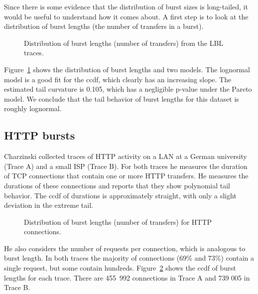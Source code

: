 \documentclass{elsart}
\begin{document}

Since there is some evidence that the distribution of burst
sizes is long-tailed, it
would be useful to understand how it comes about.  A first step is to
look at the distribution of burst lengths (the number of transfers in
a burst).

\begin{figure}[tb]
\centerline{}
\caption{Distribution of burst lengths (number of transfers) from the
LBL traces.}
\label{fig.ftp.length}
\end{figure}

Figure~\ref{fig.ftp.length} shows the distribution of burst lengths
and two models.
The lognormal model
is a good fit for the ccdf, which clearly has an increasing slope.
The estimated tail curvature is 0.105, which has a negligible
p-value under the Pareto model.  We conclude that the tail behavior of
burst lengths for this dataset is roughly lognormal.



\subsection {HTTP bursts}

Charzinski \cite{Charzinski00} collected traces of HTTP activity on a
LAN at a German university (Trace A) and a small ISP (Trace B).  For
both traces he measures the duration of TCP connections that contain
one or more HTTP transfers.  He measures the durations of these
connections and reports that they show polynomial tail behavior.  The
ccdf of durations is approximately straight, with only a slight
deviation in the extreme tail.

\begin{figure}[tb]
\centerline{}
\vspace{0.1in}
\centerline{}
\caption{Distribution of burst lengths (number of transfers) for
HTTP connections.}
\label{fig.http.length}
\end{figure}

He also considers the number of requests per connection, which is
analogous to burst length.  In both traces the majority of connections
(69\% and 73\%) contain a single request, but some contain hundreds.
Figure~\ref{fig.http.length} shows the ccdf of burst lengths for each
trace.  There are \mbox{455 992} connections in Trace A and 739 005 in Trace
B.
\end{document}
